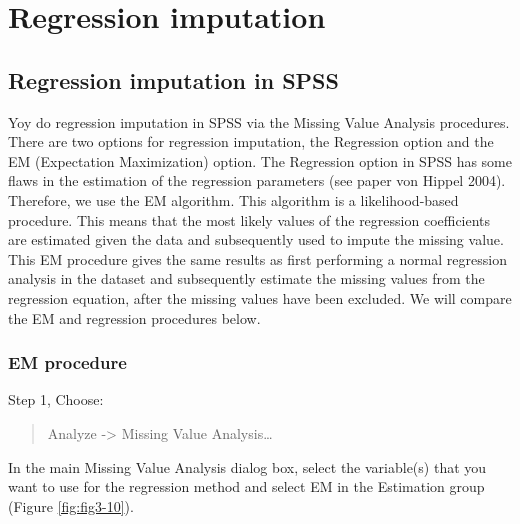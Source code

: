 \documentclass[]{book}
\theoremstyle{definition}
\theoremstyle{definition}
\theoremstyle{definition}
\theoremstyle{remark}
\begin{document}
\section{Regression imputation}\label{regression-imputation}

\subsection{Regression imputation in
SPSS}\label{regression-imputation-in-spss}

Yoy do regression imputation in SPSS via the Missing Value Analysis
procedures. There are two options for regression imputation, the
Regression option and the EM (Expectation Maximization) option. The
Regression option in SPSS has some flaws in the estimation of the
regression parameters (see paper von Hippel 2004). Therefore, we use the
EM algorithm. This algorithm is a likelihood-based procedure. This means
that the most likely values of the regression coefficients are estimated
given the data and subsequently used to impute the missing value. This
EM procedure gives the same results as first performing a normal
regression analysis in the dataset and subsequently estimate the missing
values from the regression equation, after the missing values have been
excluded. We will compare the EM and regression procedures below.

\subsubsection{EM procedure}\label{em-procedure}

Step 1, Choose:

\begin{quote}
Analyze -\textgreater{} Missing Value Analysis\ldots{}
\end{quote}

In the main Missing Value Analysis dialog box, select the variable(s)
that you want to use for the regression method and select EM in the
Estimation group (Figure \ref{fig:fig3-10}).
\end{document}
